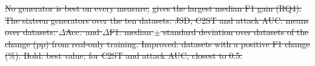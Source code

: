 \documentclass[conference]{IEEEtran}
\newcommand{\system}{\textsc{Synthagent}\xspace}
\newcommand{\best}[1]{\textbf{\boldmath #1}}
\providecommand{\DIFdeltex}[1]{{\protect\color{red}\sout{#1}}}                      %
\providecommand{\DIFdelbegin}{} %
\providecommand{\DIFdelFL}[1]{\DIFdel{#1}} %
\providecommand{\DIFdel}[1]{\texorpdfstring{\DIFdeltex{#1}}{}} %
\newcommand{\DIFscaledelfig}{0.5}
\newlength{\DIFdelgraphicswidth} %
\newlength{\DIFdelgraphicsheight} %
\newcommand{\DIFdelincludegraphics}[2][]{%
\sbox{\DIFdelgraphicsbox}{\DIFOincludegraphics[#1]{#2}}%
\settoboxwidth{\DIFdelgraphicswidth}{\DIFdelgraphicsbox} %
\settoboxtotalheight{\DIFdelgraphicsheight}{\DIFdelgraphicsbox} %
\scalebox{\DIFscaledelfig}{%
\parbox[b]{\DIFdelgraphicswidth}{\usebox{\DIFdelgraphicsbox}\\[-\baselineskip] \rule{\DIFdelgraphicswidth}{0em}}\llap{\resizebox{\DIFdelgraphicswidth}{\DIFdelgraphicsheight}{%
\setlength{\unitlength}{\DIFdelgraphicswidth}%
\begin{picture}(1,1)%
\thicklines\linethickness{2pt} %
{\color[rgb]{1,0,0}\put(0,0){\framebox(1,1){}}}%
{\color[rgb]{1,0,0}\put(0,0){\line( 1,1){1}}}%
{\color[rgb]{1,0,0}\put(0,1){\line(1,-1){1}}}%
\end{picture}%
}\hspace*{3pt}}} %
} %
\DeclareRobustCommand{\DIFdelbegin}{\DIFOdelbegin \let\includegraphics\DIFdelincludegraphics} %
\begin{document}
\DIFdelbegin %
{%
\DIFdelFL{No generator is best on every measure; }%
\DIFdelFL{gives the largest median F1 gain (RQ4). The sixteen generators over the ten datasets. JSD, C2ST and attack AUC: means over datasets. $\Delta$Acc.\ and $\Delta$F1: median $\pm$ standard deviation over datasets of the change (pp) from real-only training. Improved: datasets with a positive F1 change (\%). Bold: best value; for C2ST and attack AUC, closest to 0.5.}}
\end{document}
